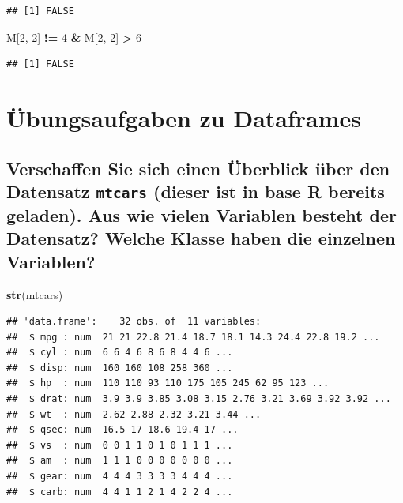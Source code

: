 \documentclass[12pt,a4paper]{article}
\newenvironment{Shaded}{\begin{snugshade}}{\end{snugshade}}
\newcommand{\DecValTok}[1]{\textcolor[rgb]{0.00,0.00,0.81}{#1}}
\newcommand{\FunctionTok}[1]{\textcolor[rgb]{0.13,0.29,0.53}{\textbf{#1}}}
\newcommand{\NormalTok}[1]{#1}
\newcommand{\SpecialCharTok}[1]{\textcolor[rgb]{0.81,0.36,0.00}{\textbf{#1}}}
\begin{document}
\begin{verbatim}
## [1] FALSE
\end{verbatim}

\begin{Shaded}
\begin{Highlighting}[]
\NormalTok{    M[}\DecValTok{2}\NormalTok{, }\DecValTok{2}\NormalTok{] }\SpecialCharTok{!=} \DecValTok{4} \SpecialCharTok{\&}\NormalTok{ M[}\DecValTok{2}\NormalTok{, }\DecValTok{2}\NormalTok{] }\SpecialCharTok{\textgreater{}} \DecValTok{6}
\end{Highlighting}
\end{Shaded}

\begin{verbatim}
## [1] FALSE
\end{verbatim}

\hypertarget{uxfcbungsaufgaben-zu-dataframes}{%
\section{Übungsaufgaben zu
Dataframes}\label{uxfcbungsaufgaben-zu-dataframes}}

\hypertarget{verschaffen-sie-sich-einen-uxfcberblick-uxfcber-den-datensatz-mtcars-dieser-ist-in-base-r-bereits-geladen.-aus-wie-vielen-variablen-besteht-der-datensatz-welche-klasse-haben-die-einzelnen-variablen}{%
\subsection{\texorpdfstring{Verschaffen Sie sich einen Überblick über
den Datensatz \texttt{mtcars} (dieser ist in base R bereits geladen).
Aus wie vielen Variablen besteht der Datensatz? Welche Klasse haben die
einzelnen
Variablen?}{Verschaffen Sie sich einen Überblick über den Datensatz mtcars (dieser ist in base R bereits geladen). Aus wie vielen Variablen besteht der Datensatz? Welche Klasse haben die einzelnen Variablen?}}\label{verschaffen-sie-sich-einen-uxfcberblick-uxfcber-den-datensatz-mtcars-dieser-ist-in-base-r-bereits-geladen.-aus-wie-vielen-variablen-besteht-der-datensatz-welche-klasse-haben-die-einzelnen-variablen}}

\begin{Shaded}
\begin{Highlighting}[]
    \FunctionTok{str}\NormalTok{(mtcars)}
\end{Highlighting}
\end{Shaded}

\begin{verbatim}
## 'data.frame':    32 obs. of  11 variables:
##  $ mpg : num  21 21 22.8 21.4 18.7 18.1 14.3 24.4 22.8 19.2 ...
##  $ cyl : num  6 6 4 6 8 6 8 4 4 6 ...
##  $ disp: num  160 160 108 258 360 ...
##  $ hp  : num  110 110 93 110 175 105 245 62 95 123 ...
##  $ drat: num  3.9 3.9 3.85 3.08 3.15 2.76 3.21 3.69 3.92 3.92 ...
##  $ wt  : num  2.62 2.88 2.32 3.21 3.44 ...
##  $ qsec: num  16.5 17 18.6 19.4 17 ...
##  $ vs  : num  0 0 1 1 0 1 0 1 1 1 ...
##  $ am  : num  1 1 1 0 0 0 0 0 0 0 ...
##  $ gear: num  4 4 4 3 3 3 3 4 4 4 ...
##  $ carb: num  4 4 1 1 2 1 4 2 2 4 ...
\end{verbatim}
\end{document}
